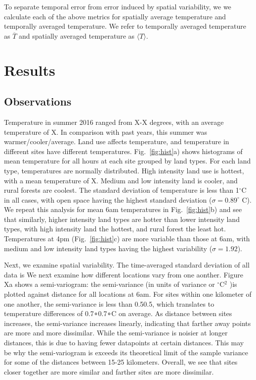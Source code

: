 \documentclass[draft,linenumbers]{agujournal}
\begin{document}
To separate temporal error from error induced by spatial variability, we we calculate each of the above metrics for spatially average temperature and temporally averaged temperature. We refer to temporally averaged temperature as $\overline{T}$ and spatially averaged temperature as $\langle T \rangle$. 
\section{Results}\label{sec:results} 
\subsection{Observations}
Temperature in summer 2016 ranged from X-X degrees, with an average temperature of X. In comparison with past years, this summer was warmer/cooler/average. Land use affects temperature, and temperature in different sites have different temperatures. Fig.~\ref{fig:hist}a) shows histograms of mean temperature for all hours at each site grouped by land types. For each land type, temperatures are normally  distributed. 
High intensity land use is hottest, with a mean temperature of X. Medium and low intensity land is cooler, and rural forests are coolest. The standard deviation of temperature is less than 1$^\circ$C in all cases, with open space having the highest standard deviation ($\sigma = 0.89^\circ$ C). We repeat this analysis for mean 6am temperatures in Fig.~\ref{fig:hist}b) and see that similarly, higher intensity land types are hotter than lower intensity land types, with high intensity land the hottest, and rural forest the least hot. Temperatures at 4pm (Fig.~\ref{fig:hist}c) are more variable than those at 6am, with medium and low intensity land types having the highest variability ($\sigma = 1.92$). 

Next, we examine spatial variability. The time-averaged standard deviation of all data is  We next examine how different locations vary from one aonther. Figure Xa shows a semi-variogram: the semi-variance (in units of variance or $^\circ$C$^2$ )is plotted against distance for all locations at 6am. For sites within one kilometer of one another, the semi-variance is less than 0.50.5, which translates to temperature differences of 0.7∘0.7∘C on average. As distance between sites increases, the semi-variance increases linearly, indicating that farther away points are more and more dissimilar. While the semi-variance is noisier at longer distances, this is due to having fewer datapoints at certain distances. This may be why the semi-variogram is exceeds its theoretical limit of the sample variance for some of the distances between 15-25 kilometers. Overall, we see that sites closer together are more similar and farther sites are more dissimilar.
\end{document}
